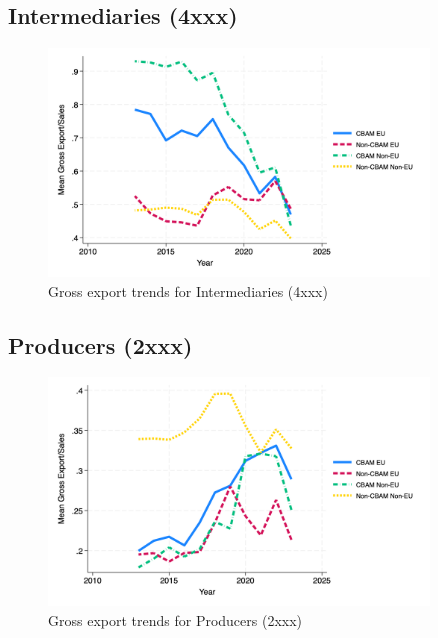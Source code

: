 \documentclass{article}
\begin{document}
\subsection{Intermediaries (4xxx)}
\begin{figure}[h!]
\centering
\includegraphics[width=0.9\textwidth]{gross_ei.png}
\caption{Gross export trends for Intermediaries (4xxx)}
\label{fig:gross_ei}
\end{figure}

\subsection{Producers (2xxx)}
\begin{figure}[h!]
\centering
\includegraphics[width=0.9\textwidth]{gross_ep.png}
\caption{Gross export trends for Producers (2xxx)}
\label{fig:gross_ep}
\end{figure}
\end{document}
